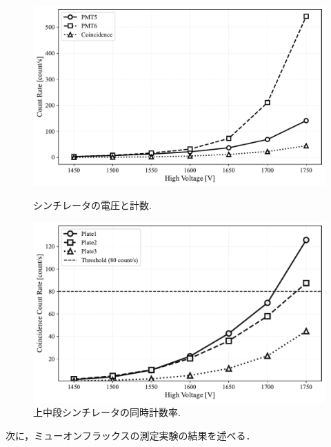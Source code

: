 \documentclass[uplatex,dvipdfmx,a4j,12pt]{jsarticle}
\begin{document}
\begin{figure}[H]
  \ContinuedFloat
  \centering
  \begin{minipage}{0.85\linewidth}
    \centering
    \includegraphics[width=\linewidth]{analysis/plate3_count_vs_voltage.pdf}
    \label{fig:lower}
  \end{minipage}
  \caption{シンチレータの電圧と計数.}
  \label{fig:cout-vs-voltage}
\end{figure}

\begin{figure}[H]
  \centering
  \includegraphics[width=0.85\linewidth]{analysis/comparison_coincidence_rates.pdf}
  \caption{上中段シンチレータの同時計数率.}  
  \label{fig:coincidence}
\end{figure}

\enskip

次に，ミューオンフラックスの測定実験の結果を述べる．
\end{document}
